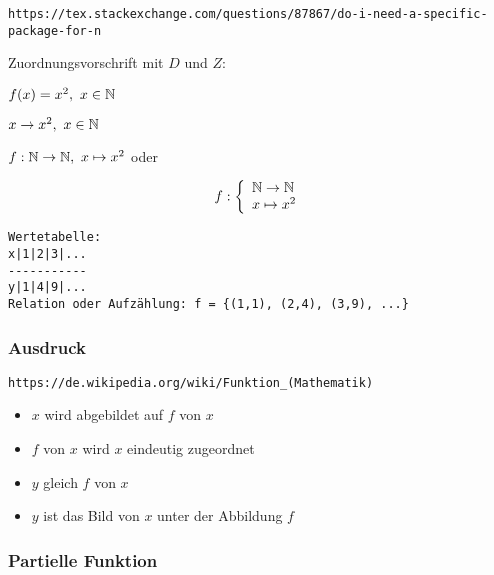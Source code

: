 \documentclass[10pt,a4paper]{article}
\begin{document}
\verb+https://tex.stackexchange.com/questions/87867/do-i-need-a-specific-package-for-n+
\vskip 8pt
\begin{labeling}{Zuordnungsvorschrift mit $D$ und $Z$:} 
  \setlength\itemsep{-3pt}
  \item[Funktionsgleichung:]   $f(x) = x^2,\ x \in \mathbb{N}$
  \item[Zuordnungsvorschrift mit $D$:] $x \rightarrow x^2,\ x \in \mathbb{N}$
    
  \setlength\itemsep{-12pt}
  \item[Zuordnungsvorschrift mit $D$ und $Z$:]
    $f: \mathbb{N} \rightarrow \mathbb{N},\ x \mapsto x^2$ oder
    \hskip -16pt
    \begin{minipage}{0.3\textwidth}
    \[ f: \left\{%
    \begin{array}{ll}
      \N \rightarrow \N \\
      x \mapsto x^2 
    \end{array}
    \right.
    \]
    \end{minipage}
    
\end{labeling}
\vskip 8pt

\begin{verbatim}
Wertetabelle:
x|1|2|3|...
-----------
y|1|4|9|...
Relation oder Aufzählung: f = {(1,1), (2,4), (3,9), ...}
\end{verbatim}
\vskip 8pt


\subsubsection {Ausdruck}

\verb+https://de.wikipedia.org/wiki/Funktion_(Mathematik)+
\vskip 15pt
\hskip -15pt
\begin{minipage}{0.9\textwidth}
  \begin{itemize}
    \setlength\itemsep{0em}

    \item $x$ wird abgebildet auf $f$ von $x$
    \item $f$ von $x$ wird $x$ eindeutig zugeordnet
    \item $y$ gleich $f$ von $x$
    \item $y$ ist das Bild von $x$ unter der Abbildung $f$
      
  \end{itemize}
\end{minipage}


\subsubsection {Partielle Funktion}
\end{document}
